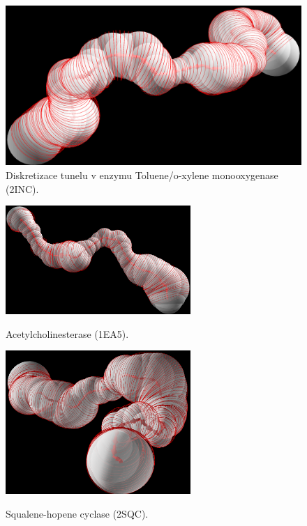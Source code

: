\begin{figure}[ht]
    \centering
    \includegraphics[width=.75\textwidth]{img/2INC.png}
    \caption{Diskretizace tunelu v enzymu  Toluene/o-xylene monooxygenase (2INC).}
  \centering
  \label{fig:2INC}
\end{figure}

\begin{figure}[ht]
\centering
\begin{minipage}{.5\textwidth}
  \centering
    \includegraphics[width=70mm]{img/1EA5.png}
    \caption{Acetylcholinesterase (1EA5).}
  \centering
  \label{fig:1EA5}
\end{minipage}%
\begin{minipage}{.5\textwidth}
     \centering
    \includegraphics[width=70mm]{img/2SQC.png}
    \caption{Squalene-hopene cyclase (2SQC).}
  \centering
  \label{fig:2SQC}
\end{minipage}
\end{figure}
